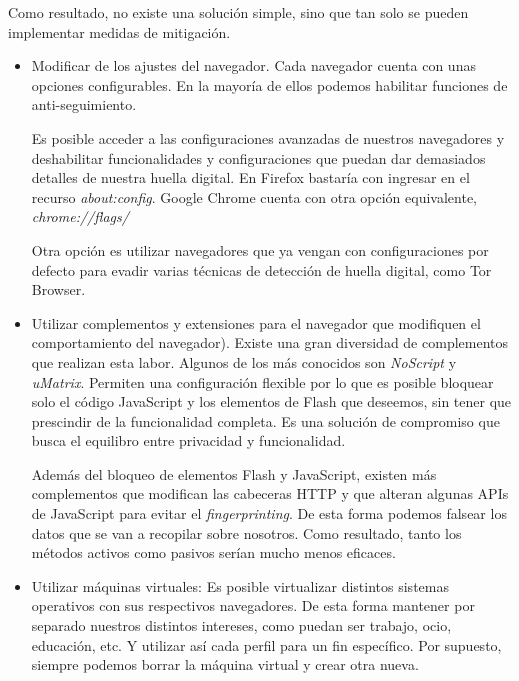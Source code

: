 Como resultado, no existe una solución simple, sino que tan solo se pueden implementar medidas de mitigación\cite{mitigations_w3c}. \par 

\begin{itemize}
	\item Modificar de los ajustes del navegador. Cada navegador cuenta con unas opciones configurables. En la mayoría de ellos podemos habilitar funciones de anti-seguimiento. \par
	
	Es posible acceder a las configuraciones avanzadas de nuestros navegadores y deshabilitar funcionalidades y configuraciones que puedan dar demasiados detalles de nuestra huella digital. En Firefox bastaría con ingresar en el recurso \textit{about:config}. Google Chrome cuenta con otra opción equivalente, \textit{chrome://flags/} \par
	
	Otra opción es utilizar navegadores que ya vengan con configuraciones por defecto para evadir varias técnicas de detección de huella digital, como Tor Browser. \par 
	
	\item Utilizar complementos y extensiones para el navegador que modifiquen el comportamiento del navegador\cite{pixelprivacy}). Existe una gran diversidad de complementos que realizan esta labor. Algunos de los más conocidos son \textit{NoScript} y \textit{uMatrix}.
	Permiten una configuración flexible por lo que es posible bloquear solo el código JavaScript y los elementos de Flash que deseemos, sin tener que prescindir de la funcionalidad completa. Es una solución de compromiso que busca el equilibro entre privacidad y funcionalidad. \par
	
	Además del bloqueo de elementos Flash y JavaScript, existen más complementos que modifican las cabeceras HTTP y que alteran algunas APIs de JavaScript para evitar el \textit{fingerprinting}. De esta forma podemos falsear los datos que se van a recopilar sobre nosotros. Como resultado, tanto los métodos activos como pasivos serían mucho menos eficaces. \par 
	
	
	\item Utilizar máquinas virtuales: Es posible virtualizar distintos sistemas operativos con sus respectivos navegadores. De esta forma mantener por separado nuestros distintos intereses, como puedan ser trabajo, ocio, educación, etc. Y utilizar así cada perfil para un fin específico. Por supuesto, siempre podemos borrar la máquina virtual y crear otra nueva\cite{restoreprivacy}. \par 
	
\end{itemize}

